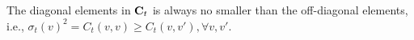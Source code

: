 %
%  

\begin{lemma}
\label{lemma:nnC_sub}	
The diagonal elements in ${\mathbf C}_t$ is always no smaller than the off-diagonal elements, i.e., $\sigma_t(v)^2 = C_t(v,v)\geq C_t(v,v'), \forall v,v'$.
\end{lemma}


\newcommand{\bbv}{\bar{\bv}}
\newcommand{\bell}{\boldsymbol{\ell}}

